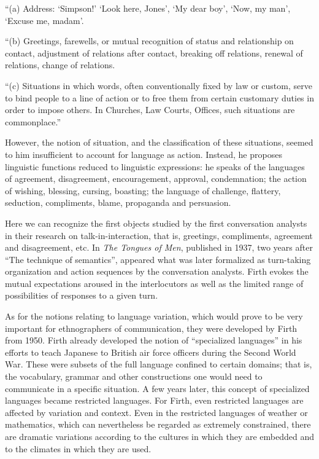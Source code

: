 \documentclass[output=paper]{langscibook}
\begin{document}
``(a) Address: ‘Simpson!’ ‘Look here, Jones’, ‘My dear boy’, ‘Now, my man’, ‘Excuse me, madam’.

``(b) Greetings, farewells, or mutual recognition of status and relationship on contact, adjustment of relations after contact, breaking off relations, renewal of relations, change of relations.

``(c) Situations in which words, often conventionally fixed by law or custom, serve to bind people to a line of action or to free them from certain customary duties in order to impose others. In Churches, Law Courts, Offices, such situations are commonplace.” 

However, the notion of situation, and the classification of these situations, seemed to him insufficient to account for language as action. Instead, he proposes linguistic functions reduced to linguistic expressions: he speaks of the languages of agreement, disagreement, encouragement, approval, condemnation; the action of wishing, blessing, cursing, boasting; the language of challenge, flattery, seduction, compliments, blame, propaganda and persuasion. 

Here we can recognize the first objects studied by the first conversation analysts in their research on talk-in-interaction, that is, greetings, compliments, agreement and disagreement, etc. In \textit{The Tongues of Men}, published in 1937, two years after “The technique of semantics”, appeared what was later formalized as turn-taking organization and action sequences by the conversation analysts. Firth evokes the mutual expectations aroused in the interlocutors as well as the limited range of possibilities of responses to a given turn. 

As for the notions relating to language variation, which would prove to be very important for ethnographers of communication, they were developed by Firth from 1950. Firth already developed the notion of ``specialized languages'' in his efforts to teach Japanese to British air force officers during the Second World War. These were subsets of the full language confined to certain domains; that is, the vocabulary, grammar and other constructions one would need to communicate in a specific situation. A few years later, this concept of specialized languages became restricted languages. For Firth, even restricted languages are affected by variation and context. Even in the restricted languages of weather or mathematics, which can nevertheless be regarded as extremely constrained, there are dramatic variations according to the cultures in which they are embedded and to the climates in which they are used. 
\end{document}
